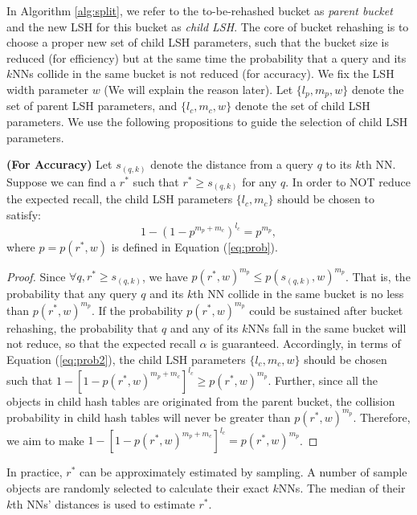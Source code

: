 In Algorithm \ref{alg:split}, we refer to the to-be-rehashed bucket as \emph{parent bucket} and the new LSH for this bucket as \emph{child LSH}. The core of bucket rehashing is to choose a proper new set of child LSH parameters, such that the bucket size is reduced (for efficiency) but at the same time the probability that a query and its $k$NNs collide in the same bucket is not reduced (for accuracy). We fix the LSH width parameter $w$ (We will explain the reason later). Let $\{l_p,m_p,w\}$ denote the set of parent LSH parameters, and $\{l_c,m_c,w\}$ denote the set of child LSH parameters. We use the following propositions to guide the selection of child LSH parameters.

\begin{prop}
\label{prop:accuracy}
\textbf{(For Accuracy)} Let $s_{(q,k)}$ denote the distance from a query $q$ to its $k$th NN. Suppose we can find a $r^*$ such that $r^*\geq s_{(q,k)}$ for any $q$. In order to NOT reduce the expected recall, the child LSH parameters $\{l_c,m_c\}$ should be chosen to satisfy:
\begin{equation}\label{eq:sustainprob}
    1-(1-p^{m_p+m_{c}})^{l_{c}}=p^{m_{p}},
\end{equation}
where $p=p(r^*,w)$ is defined in Equation (\ref{eq:prob}).
\end{prop}
\begin{proof}
Since $\forall q, r^*\geq s_{(q,k)}$, we have $p(r^*,w)^{m_p}\leq p(s_{(q,k)},w)^{m_p}$. That is, the probability that any query $q$ and its $k$th NN collide in the same bucket is no less than $p(r^*,w)^{m_p}$. If the probability $p(r^*,w)^{m_p}$ could be sustained after bucket rehashing, the probability that $q$ and any of its $k$NNs fall in the same bucket will not reduce, so that the expected recall $\alpha$ is guaranteed. Accordingly, in terms of Equation (\ref{eq:prob2}), the child LSH parameters $\{l_c,m_c,w\}$ should be chosen such that $1-[1-p(r^*,w)^{m_p+m_{c}}]^{l_{c}}\geq p(r^*,w)^{m_{p}}$. Further, since all the objects in child hash tables are originated from the parent bucket, the collision probability in child hash tables will never be greater than $p(r^*,w)^{m_{p}}$. Therefore, we aim to make $1-[1-p(r^*,w)^{m_p+m_{c}}]^{l_{c}}=p(r^*,w)^{m_{p}}$.
\end{proof}

In practice, $r^*$ can be approximately estimated by sampling. A number of sample objects are randomly selected to calculate their exact $k$NNs. The median of their $k$th NNs' distances is used to estimate $r^*$.

